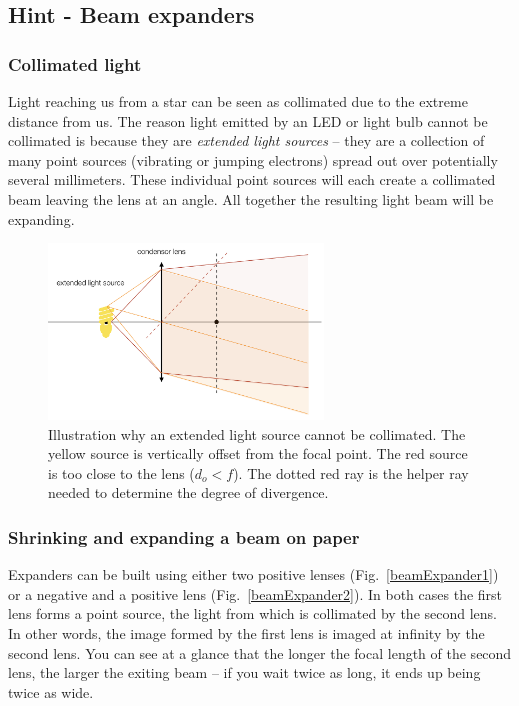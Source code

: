 \documentclass[a4paper]{report}
\begin{document}
    \clearpage
    
    \subsection{Hint - Beam expanders}
	\hypertarget{hintTo-expand}{}
	
	\subsubsection{Collimated light}
	Light reaching us from a star can be seen as collimated due to the extreme distance from us. The reason light emitted by an LED or light bulb cannot be collimated is because they are \emph{extended light sources} -- they are a collection of many point sources (vibrating or jumping electrons) spread out over potentially several millimeters. These individual point sources will each create a collimated beam leaving the lens at an angle. All together the resulting light beam will be expanding.

	
	\begin{figure}[h]
		\center
		\includegraphics[width=0.65\textwidth]{figures/collimated_led.png}
		\captionsetup{width=0.65\textwidth}
		\caption{Illustration why an extended light source cannot be collimated. The yellow source is vertically offset from the focal point. The red source is too close to the lens ($d_o<f$). The dotted red ray is the helper ray needed to determine the degree of divergence.}
		\label{collimation}
	\end{figure}
	
	\subsubsection{Shrinking and expanding a beam on paper}
	Expanders can be built using either two positive lenses (Fig.~\ref{beamExpander1}) or a negative and a positive lens (Fig.~\ref{beamExpander2}). In both cases the first lens forms a point source, the light from which is collimated by the second lens. In other words, the image formed by the first lens is imaged at infinity by the second lens. You can see at a glance that the longer the focal length of the second lens, the larger the exiting beam -- if you wait twice as long, it ends up being twice as wide. 
	
\end{document}
